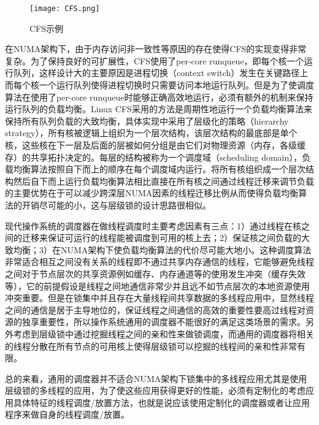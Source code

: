 \begin{figure}[t]
	\centering
	\texttt{[image: CFS.png]}
	\caption{CFS示例}
	\label{Fig:CFS}
\end{figure}

在NUMA架构下，由于内存访问非一致性等原因的存在使得CFS的实现变得非常复杂。为了保持良好的可扩展性，CFS使用了per-core runqueue，即每个核一个运行队列，这样设计大的主要原因是进程切换（context switch）发生在关键路径上而每个核一个运行队列使得进程切换时只需要访问本地运行队列。但是为了使调度算法在使用了per-core runqueue时能够正确高效地运行，必须有额外的机制来保持运行队列的负载均衡。Linux CFS采用的方法是周期性地运行一个负载均衡算法来保持所有队列负载的大致均衡，具体实现中采用了层级化的策略（hierarchy strategy），所有核被逻辑上组织为一个层次结构，该层次结构的最底部是单个核，这些核在下一层及后面的层被如何分组是由它们对物理资源（内存，各级缓存）的共享拓扑决定的。每层的结构被称为一个调度域（scheduling domain），负载均衡算法按照自下而上的顺序在每个调度域内运行。将所有核组织成一个层次结构然后自下而上运行负载均衡算法相比直接在所有核之间通过线程迁移来调节负载的主要优势在于可以减少跨深层NUMA因素的线程迁移比例从而使得负载均衡算法的开销尽可能的小，这与层级锁的设计思路很相似。

现代操作系统的调度器在做线程调度时主要考虑因素有三点：1）通过线程在核之间的迁移来保证可运行的线程能被调度到可用的核上去；2）保证核之间负载的大致均衡；3）在NUMA架构下使负载均衡算法的代价尽可能大地小。这种调度算法非常适合相互之间没有关系的线程即不通过共享内存通信的线程，它能够避免线程之间对于节点层次的共享资源例如缓存、内存通道等的使用发生冲突（缓存失效等），它的前提假设是线程之间地通信非常少并且远不如节点层次的本地资源使用冲突重要。但是在锁集中并且存在大量线程间共享数据的多线程应用中，显然线程之间的通信是居于主导地位的，保证线程之间通信的高效的重要性要高过线程对资源的独享重要性\cite{dice2015lock}，所以操作系统通用的调度器不能很好的满足这类场景的需求。另外考虑到层级锁中通过挖掘线程之间的亲和性来做锁调度，而通用的调度器将相关的线程分散在所有节点的可用核上使得层级锁可以挖掘的线程间的亲和性非常有限。

总的来看，通用的调度器并不适合NUMA架构下锁集中的多线程应用尤其是使用层级锁的多线程的应用，为了使这些应用获得更好的性能，必须有定制化的考虑应用具体特征的线程调度/放置方法，也就是说应该使用定制化的调度器或者让应用程序来做自身的线程调度/放置。


